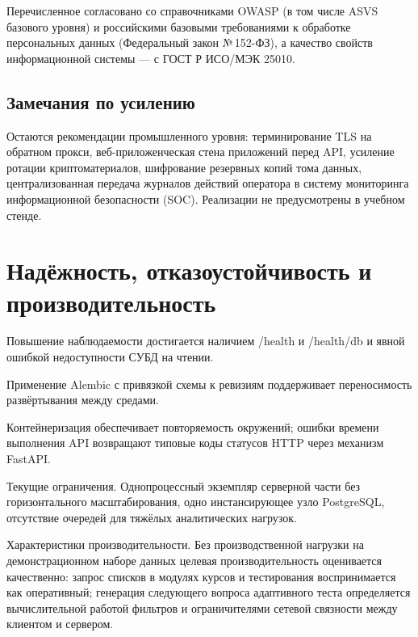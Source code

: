 Перечисленное согласовано со справочниками OWASP (в том числе ASVS базового уровня) и российскими базовыми требованиями к обработке персональных данных (Федеральный закон №\,152-ФЗ), а качество свойств информационной системы --- с ГОСТ Р ИСО/МЭК 25010\cite{owasp_top10_2021,owasp_asvs,fz152,gost250102015,pydantic_docs,fastapi_docs}.

\subsection{Замечания по усилению}

Остаются рекомендации промышленного уровня: терминирование TLS на обратном прокси, веб-приложенческая стена приложений перед API, усиление ротации криптоматериалов, шифрование резервных копий тома данных, централизованная передача журналов действий оператора в систему мониторинга информационной безопасности (SOC). Реализации не предусмотрены в учебном стенде.

\section{Надёжность, отказоустойчивость и производительность}

Повышение наблюдаемости достигается наличием /health и /health/db и явной ошибкой недоступности СУБД на чтении.

Применение Alembic с привязкой схемы к ревизиям поддерживает переносимость развёртывания между средами\cite{alembic_docs,sqlalchemy_docs}.

Контейнеризация обеспечивает повторяемость окружений; ошибки времени выполнения API возвращают типовые коды статусов HTTP через механизм FastAPI.

Текущие ограничения. Однопроцессный экземпляр серверной части без горизонтального масштабирования, одно инстансирующее узло PostgreSQL, отсутствие очередей для тяжёлых аналитических нагрузок.

Характеристики производительности. Без производственной нагрузки на демонстрационном наборе данных целевая производительность оценивается качественно: запрос списков в модулях курсов и тестирования воспринимается как оперативный; генерация следующего вопроса адаптивного теста определяется вычислительной работой фильтров и ограничителями сетевой связности между клиентом и сервером.


